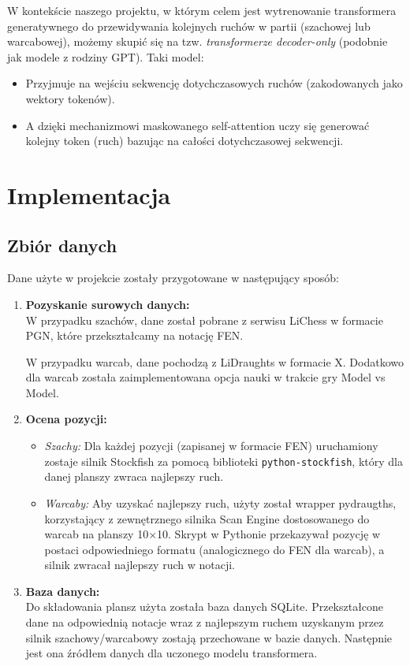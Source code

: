 \documentclass[12pt]{article}
\begin{document}
W kontekście naszego projektu, w którym celem jest wytrenowanie transformera generatywnego do przewidywania kolejnych ruchów w partii (szachowej lub warcabowej), możemy skupić się na tzw. \emph{transformerze decoder-only} (podobnie jak modele z rodziny GPT). Taki model:
\begin{itemize}
    \item Przyjmuje na wejściu sekwencję dotychczasowych ruchów (zakodowanych jako wektory tokenów).
    \item A dzięki mechanizmowi maskowanego self-attention uczy się generować kolejny token (ruch) bazując na całości dotychczasowej sekwencji.
\end{itemize}



\section{Implementacja}
\subsection{Zbiór danych}
Dane użyte w projekcie zostały przygotowane w następujący sposób:
\begin{enumerate}
    \item \textbf{Pozyskanie surowych danych:}
    \\W przypadku szachów, dane został pobrane z serwisu LiChess w formacie PGN, które przekształcamy na notację FEN. 
    
    W przypadku warcab, dane pochodzą z LiDraughts w formacie X. Dodatkowo dla warcab została zaimplementowana opcja nauki w trakcie gry Model vs Model.
    \item \textbf{Ocena pozycji:}
    \begin{itemize}
        \item \emph{Szachy:} Dla każdej pozycji (zapisanej w formacie FEN) uruchamiony zostaje silnik Stockfish za pomocą biblioteki \texttt{python-stockfish}, który dla danej planszy zwraca najlepszy ruch. 
        \item \emph{Warcaby:} Aby uzyskać najlepszy ruch, użyty został wrapper pydraugths, korzystający z zewnętrznego silnika Scan Engine dostosowanego do warcab na planszy 10×10. Skrypt w Pythonie przekazywał pozycję w postaci odpowiedniego formatu (analogicznego do FEN dla warcab), a silnik zwracał najlepszy ruch w notacji. 
    \end{itemize}
    \item \textbf{Baza danych:}
    \\Do składowania plansz użyta została baza danych SQLite. Przekształcone dane na odpowiednią notacje wraz z najlepszym ruchem uzyskanym przez silnik szachowy/warcabowy zostają przechowane w bazie danych. Następnie jest ona źródłem danych dla uczonego modelu transformera. 
\end{enumerate}
\end{document}

